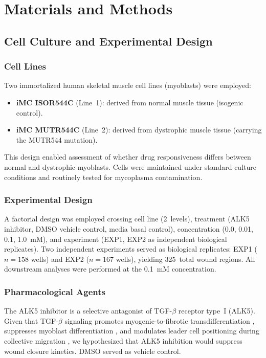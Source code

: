 \section{Materials and Methods}

\subsection{Cell Culture and Experimental Design}

\subsubsection{Cell Lines}
Two immortalized human skeletal muscle cell lines (myoblasts) were employed:

\begin{itemize}
  \item \textbf{iMC ISOR544C} (Line~1): derived from normal muscle tissue (isogenic control).
  \item \textbf{iMC MUTR544C} (Line~2): derived from dystrophic muscle tissue (carrying the MUTR544 mutation).
\end{itemize}

This design enabled assessment of whether drug responsiveness differs between normal and dystrophic myoblasts. Cells were maintained under standard culture conditions and routinely tested for mycoplasma contamination.

\subsubsection{Experimental Design}
A factorial design was employed crossing cell line (2~levels), treatment (ALK5 inhibitor, DMSO vehicle control, media basal control), concentration (0.0, 0.01, 0.1, 1.0~mM), and experiment (EXP1, EXP2 as independent biological replicates). Two independent experiments served as biological replicates: EXP1 ($n = 158$ wells) and EXP2 ($n = 167$ wells), yielding 325~total wound regions. All downstream analyses were performed at the 0.1~mM concentration.

\subsubsection{Pharmacological Agents}
The ALK5 inhibitor is a selective antagonist of TGF-$\beta$ receptor type~I (ALK5). Given that TGF-$\beta$ signaling promotes myogenic-to-fibrotic transdifferentiation \citep{Li2004}, suppresses myoblast differentiation \citep{McFarland2001}, and modulates leader cell positioning during collective migration \citep{Vishwakarma2014}, we hypothesized that ALK5 inhibition would suppress wound closure kinetics. DMSO served as vehicle control.


